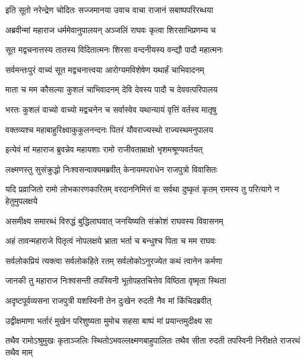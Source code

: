 \twolineshloka
{इति सूतो नरेन्द्रेण चोदितः सज्जमानया}
{उवाच वाचा राजानं सबाष्पपरिरब्धया} %

\twolineshloka
{अब्रवीन्मां महाराज धर्ममेवानुपालयन्}
{अञ्जलिं राघवः कृत्वा शिरसाभिप्रणम्य च} %

\twolineshloka
{सूत मद्वचनात्तस्य तातस्य विदितात्मनः}
{शिरसा वन्दनीयस्य वन्द्यौ पादौ महात्मनः} %

\twolineshloka
{सर्वमन्तःपुरं वाच्यं सूत मद्वचनात्त्वया}
{आरोग्यमविशेषेण यथार्हं चाभिवादनम्} %

\twolineshloka
{माता च मम कौसल्या कुशलं चाभिवादनम्}
{देवि देवस्य पादौ च देववत्परिपालय} %

\twolineshloka
{भरतः कुशलं वाच्यो वाच्यो मद्वचनेन च}
{सर्वास्वेव यथान्यायं वृत्तिं वर्तस्व मातृषु} %

\twolineshloka
{वक्तव्यश्च महाबाहुरिक्ष्वाकुकुलनन्दनः}
{पितरं यौवराज्यस्थो राज्यस्थमनुपालय} %

\twolineshloka
{इत्येवं मां महाराज ब्रुवन्नेव महायशाः}
{रामो राजीवताम्राक्षो भृशमश्रूण्यवर्तयत्} %

\twolineshloka
{लक्ष्मणस्तु सुसंक्रुद्धो निःश्वसन्वाक्यमब्रवीत्}
{केनायमपराधेन राजपुत्रो विवासितः} %

\threelineshloka
{यदि प्रव्राजितो रामो लोभकारणकारितम्}
{वरदाननिमित्तं वा सर्वथा दुष्कृतं कृतम्}
{रामस्य तु परित्यागे न हेतुमुपलक्षये} %

\twolineshloka
{असमीक्ष्य समारब्धं विरुद्धं बुद्धिलाघवात्}
{जनयिष्यति संक्रोशं राघवस्य विवासनम्} %

\twolineshloka
{अहं तावन्महाराजे पितृत्वं नोपलक्षये}
{भ्राता भर्ता च बन्धुश्च पिता च मम राघवः} %

\twolineshloka
{सर्वलोकप्रियं त्यक्त्वा सर्वलोकहिते रतम्}
{सर्वलोकोऽनुरज्येत कथं त्वानेन कर्मणा} %

\twolineshloka
{जानकी तु महाराज निःश्वसन्ती तपस्विनी}
{भूतोपहतचित्तेव विष्ठिता वृष्मृता स्थिता} %

\twolineshloka
{अदृष्टपूर्वव्यसना राजपुत्री यशस्विनी}
{तेन दुःखेन रुदती नैव मां किंचिदब्रवीत्} %

\twolineshloka
{उद्वीक्षमाणा भर्तारं मुखेन परिशुष्यता}
{मुमोच सहसा बाष्पं मां प्रयान्तमुदीक्ष्य सा} %

\fourlineindentedshloka
{तथैव रामोऽश्रुमुखः कृताञ्जलिः}
{ स्थितोऽभवल्लक्ष्मणबाहुपालितः}
{तथैव सीता रुदती तपस्विनी}
{ निरीक्षते राजरथं तथैव माम्} %



